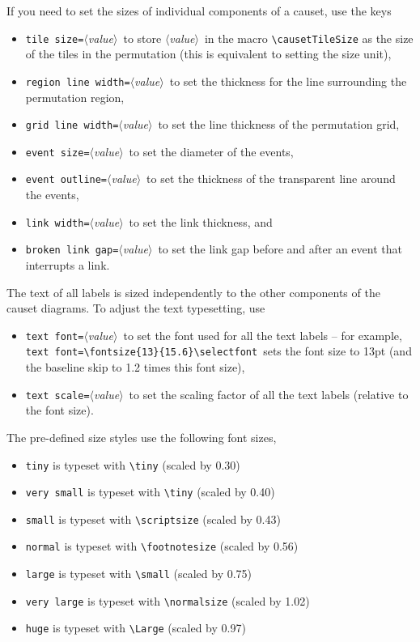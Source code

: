 \documentclass[12pt]{article}
\newcommand*{\PH}[1][value]{{\small\itshape$\langle$#1$\rangle$}} %
\begin{document}
If you need to set the sizes of individual components of a causet, use the keys \vspace{-1ex}
\begin{itemize}\itemsep=-1ex
  \item \lstinline&tile size=&\PH\ to store \PH\ in the macro \lstinline&\causetTileSize& as the size of the tiles in the permutation (this is equivalent to setting the size unit),
  \item \lstinline&region line width=&\PH\ to set the thickness for the line surrounding the permutation region,
  \item \lstinline&grid line width=&\PH\ to set the line thickness of the permutation grid,
  \item \lstinline&event size=&\PH\ to set the diameter of the events,
  \item \lstinline&event outline=&\PH\ to set the thickness of the transparent line around the events,
  \item \lstinline&link width=&\PH\ to set the link thickness, and
  \item \lstinline&broken link gap=&\PH\ to set the link gap before and after an event that interrupts a link.
\end{itemize}

The text of all labels is sized independently to the other components of the causet diagrams.
To adjust the text typesetting, use \vspace{-1ex}
\begin{itemize}\itemsep=-1ex
  \item \lstinline&text font=&\PH\ to set the font used for all the text labels -- for example, \lstinline&text font=\fontsize{13}{15.6}\selectfont&\ sets the font size to 13pt (and the baseline skip to 1.2 times this font size),
  \item \lstinline&text scale=&\PH\ to set the scaling factor of all the text labels (relative to the font size).
\end{itemize}
The pre-defined size styles use the following font sizes, \vspace{-1ex}
\begin{itemize}\itemsep=-1ex
  \item \lstinline&tiny& is typeset with \lstinline&\tiny& (scaled by 0.30)
  \item \lstinline&very small& is typeset with \lstinline&\tiny& (scaled by 0.40)
  \item \lstinline&small& is typeset with \lstinline&\scriptsize& (scaled by 0.43)
  \item \lstinline&normal& is typeset with \lstinline&\footnotesize& (scaled by 0.56)
  \item \lstinline&large& is typeset with \lstinline&\small& (scaled by 0.75)
  \item \lstinline&very large& is typeset with \lstinline&\normalsize& (scaled by 1.02)
  \item \lstinline&huge& is typeset with \lstinline&\Large& (scaled by 0.97)
\end{itemize}
\end{document}
